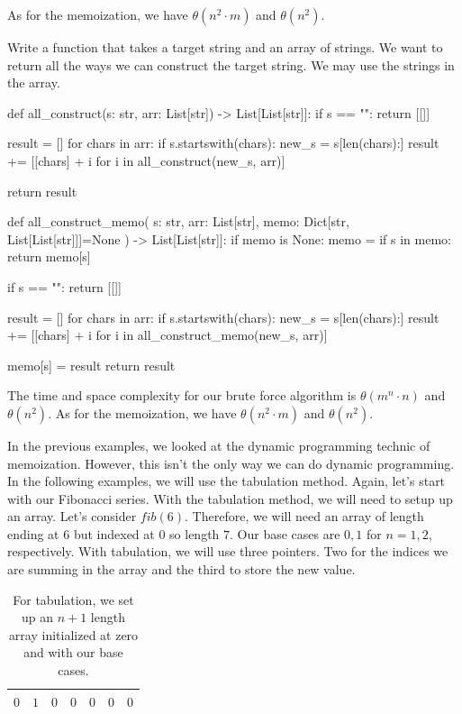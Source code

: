 \documentclass[12pt,dvipsnames,svgnames,x11names]{article}
\begin{document}
As for the memoization, we have \(\theta(n^2\cdot m)\) and \(\theta(n^2)\).
\par\medskip
Write a function that takes a target string and an array of strings. We want to return all the ways we can
construct the target string. We may use the strings in the array.
\begin{python}
def all_construct(s: str, arr: List[str]) -> List[List[str]]:
  if s == "":
    return [[]]
    
  result = []
  for chars in arr:
    if s.startswith(chars):
        new_s = s[len(chars):]
        result += [[chars] + i for i in all_construct(new_s, arr)]
            
  return result
    
    
def all_construct_memo(
    s: str, 
    arr: List[str], 
    memo: Dict[str, List[List[str]]]=None
    ) -> List[List[str]]:
  if memo is None:
    memo = {}
  if s in memo:
    return memo[s]
    
  if s == "":
    return [[]]
    
  result = []
  for chars in arr:
    if s.startswith(chars):
      new_s = s[len(chars):]
      result += [[chars] + i for i in all_construct_memo(new_s, arr)]
    
  memo[s] = result
  return result
\end{python}
The time and space complexity for our brute force algorithm is \(\theta(m^n\cdot n)\) and \(\theta(n^2)\).
As for the memoization, we have \(\theta(n^2\cdot m)\) and \(\theta(n^2)\).
\par\medskip
In the previous examples, we looked at the dynamic programming technic of memoization. However,
this isn't the only way we can do dynamic programming. In the following examples, we will use the 
tabulation method. Again, let's start with our Fibonacci series. With the tabulation method, we will need
to setup up an array. Let's consider \(fib(6)\). Therefore, we will need an array of length ending at \(6\)
but indexed at \(0\) so length \(7\). Our base cases are \(0, 1\) for \(n = 1, 2\), respectively. With
tabulation, we will use three pointers. Two for the indices we are summing in the array and the third to
store the new value.
\begin{table}[h]
	\centering
	\begin{tabular}{| *{7}{|c|} |}
  		\hline			
  		\(0\) & \(1\) & \(0\) & \(0\) & \(0\) & \(0\) & \(0\) \\
  		\hline  
	\end{tabular}
	\caption{For tabulation, we set up an \(n + 1\) length array initialized at zero and with our base cases.}
	\label{tab:fib_tab}
\end{table}
\end{document}
